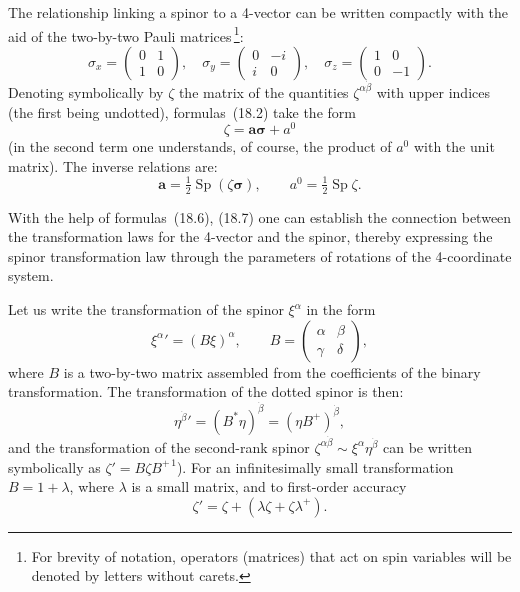 The relationship linking a spinor to a 4-vector can be written compactly with the aid of the two-by-two Pauli matrices\,\footnote{For brevity of notation, operators (matrices) that act on spin variables will be denoted by letters without carets.}:
\begin{equation}
\sigma_x = \begin{pmatrix} 0 & 1\\ 1 & 0 \end{pmatrix},\quad
\sigma_y = \begin{pmatrix} 0 & -i\\ i & 0 \end{pmatrix},\quad
\sigma_z = \begin{pmatrix} 1 & 0\\ 0 & -1 \end{pmatrix}.
\tag{18.5}
\end{equation}
Denoting symbolically by $\zeta$ the matrix of the quantities $\zeta^{\alpha\dot\beta}$ with upper indices (the first being undotted), formulas~(18.2) take the form
\begin{equation}
\zeta = \mathbf{a}\boldsymbol{\sigma} + a^0
\tag{18.6}
\end{equation}
(in the second term one understands, of course, the product of $a^0$ with the unit matrix). The inverse relations are:
\begin{equation}
\mathbf{a} = \tfrac{1}{2}\operatorname{Sp}(\zeta\boldsymbol{\sigma}),\qquad a^0 = \tfrac{1}{2}\operatorname{Sp}\zeta.
\tag{18.7}
\end{equation}

With the help of formulas~(18.6), (18.7) one can establish the connection between the transformation laws for the 4-vector and the spinor, thereby expressing the spinor transformation law through the parameters of rotations of the 4-coordinate system.

Let us write the transformation of the spinor $\xi^\alpha$ in the form
\begin{equation}
{\xi^{\alpha}}' = (B\xi)^\alpha,\qquad B = \begin{pmatrix} \alpha & \beta\\ \gamma & \delta \end{pmatrix},
\tag{18.8}
\end{equation}
where $B$ is a two-by-two matrix assembled from the coefficients of the binary transformation. The transformation of the dotted spinor is then:
\begin{equation}
{\eta^{\dot\beta}}' = (B^*\eta)^{\dot\beta} = (\eta B^+)^{\dot\beta},
\tag{18.9}
\end{equation}
and the transformation of the second-rank spinor $\zeta^{\alpha\dot\beta} \sim \xi^\alpha\eta^{\dot\beta}$ can be written symbolically as $\zeta' = B\zeta B^{+\,1}$). For an infinitesimally small transformation $B = 1 + \lambda$, where $\lambda$ is a small matrix, and to first-order accuracy
\begin{equation}
\zeta' = \zeta + (\lambda\zeta + \zeta\lambda^+).
\tag{18.10}
\end{equation}

